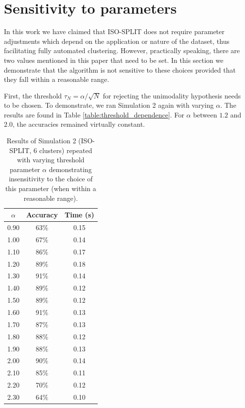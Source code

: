 \documentclass[10pt]{article}
\begin{document}
\section {Sensitivity to parameters}
\label{appendixSensitivity}

In this work we have claimed that ISO-SPLIT does not require parameter adjustments which depend on the application or nature of the dataset, thus facilitating fully automated clustering. However, practically speaking, there are two values mentioned in this paper that need to be set. In this section we demonstrate that the algorithm is not sensitive to these choices provided that they fall within a reasonable range.

First, the threshold $\tau_N=\alpha/\sqrt{N}$ for rejecting the unimodality hypothesis needs to be chosen. To demonstrate, we ran Simulation 2 again with varying $\alpha$. The results are found in Table \ref{table:threshold_dependence}. For $\alpha$ between $1.2$ and $2.0$, the accuracies remained virtually constant.

  \begin{table}[t]
\centering
    \begin{tabular}{c|c|c|}
	\textbf{$\alpha$} & \textbf{Accuracy} & \textbf{Time (s)} \\
	\hline
0.90 & 63\% & 0.15 \\
1.00 & 67\% & 0.14 \\
1.10 & 86\% & 0.17 \\
1.20 & 89\% & 0.18 \\
1.30 & 91\% & 0.14 \\
1.40 & 89\% & 0.12 \\
1.50 & 89\% & 0.12 \\
1.60 & 91\% & 0.13 \\
1.70 & 87\% & 0.13 \\
1.80 & 88\% & 0.12 \\
1.90 & 88\% & 0.13 \\
2.00 & 90\% & 0.14 \\
2.10 & 85\% & 0.11 \\
2.20 & 70\% & 0.12 \\
2.30 & 64\% & 0.10 \\
\end{tabular}
\caption{
\label{table:alpha_dependence}
Results of Simulation 2 (ISO-SPLIT, 6 clusters) repeated with varying threshold parameter $\alpha$ demonstrating insensitivity to the choice of this parameter (when within a reasonable range).
}
\end{table}
\end{document}
